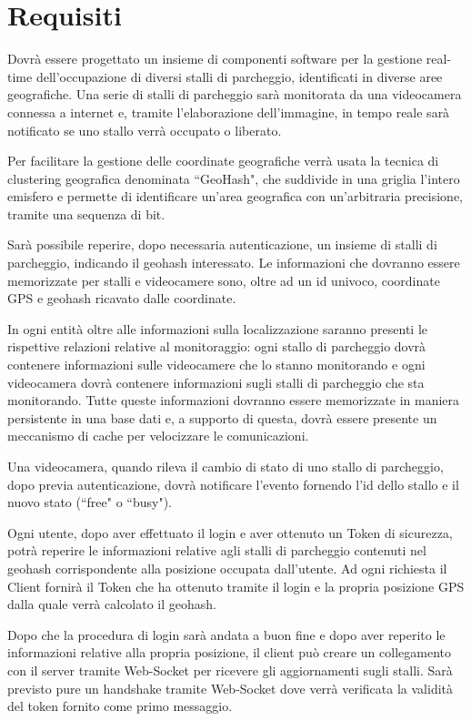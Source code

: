 \chapter{Requisiti}
Dovrà essere progettato un insieme di componenti software per la gestione real-time dell'occupazione di diversi stalli di parcheggio, identificati in diverse aree geografiche.
Una serie di stalli di parcheggio sarà monitorata da una videocamera connessa a internet e, tramite l'elaborazione dell'immagine, in tempo reale sarà notificato se uno stallo verrà occupato o liberato. 

Per facilitare la gestione  delle coordinate geografiche verrà usata la tecnica di clustering geografica denominata ``GeoHash", che suddivide in una griglia l'intero emisfero e permette di identificare un'area geografica con un'arbitraria precisione, tramite una sequenza di bit. 

Sarà possibile reperire, dopo necessaria autenticazione, un insieme di stalli di parcheggio, indicando il geohash interessato. Le informazioni che dovranno essere memorizzate per stalli e videocamere sono, oltre ad un id univoco, coordinate GPS e geohash ricavato dalle coordinate. 

In ogni entità oltre alle informazioni sulla localizzazione saranno presenti le rispettive relazioni relative al monitoraggio: ogni stallo di parcheggio dovrà contenere informazioni sulle videocamere che lo stanno monitorando e ogni videocamera dovrà contenere informazioni sugli stalli di parcheggio che sta monitorando.
Tutte queste informazioni dovranno essere memorizzate in maniera persistente in una base dati e, a supporto di questa, dovrà essere presente un meccanismo di cache per velocizzare le comunicazioni.

Una videocamera, quando rileva il cambio di stato di uno stallo di parcheggio, dopo previa autenticazione, dovrà notificare l'evento fornendo l'id dello stallo e il nuovo stato (``free" o ``busy").

Ogni utente, dopo aver effettuato il login e aver ottenuto un Token di sicurezza, potrà reperire le informazioni relative agli stalli di parcheggio contenuti nel geohash corrispondente alla posizione occupata dall'utente. Ad ogni richiesta il Client fornirà il Token che ha ottenuto tramite il login e la propria posizione GPS dalla quale verrà calcolato il geohash.

Dopo che la procedura di login sarà andata a buon fine e dopo aver reperito le informazioni relative alla propria posizione, il client può creare un collegamento con il server tramite Web-Socket per ricevere gli aggiornamenti sugli stalli. Sarà previsto pure un handshake tramite Web-Socket dove verrà verificata la validità del token fornito come primo messaggio.






